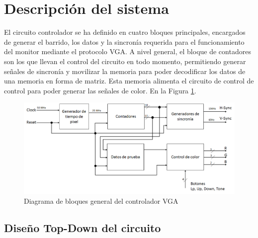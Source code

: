\documentclass[12pt,a4paper]{article}
\begin{document}
\section{Descripción del sistema}
El circuito controlador se ha definido en cuatro bloques principales, encargados de generar el barrido, los datos y la sincronía requerida para el funcionamiento del monitor mediante el protocolo VGA. A nivel general, el bloque de contadores son los que llevan el control del circuito en todo momento, permitiendo generar señales de sincronía y movilizar la memoria para poder decodificar los datos de una memoria en forma de matriz. Esta memoria alimenta el circuito de control de control para poder generar las señales de color. En la Figura \ref{fig:generalSys}.

\begin{figure}[hbtp]
	\centering
	\includegraphics[width=18cm]{Img/diagramaIntro.png}
	\caption{Diagrama de bloques general del controlador VGA}
	\label{fig:generalSys}
\end{figure}

\subsection{Diseño Top-Down del circuito}
\end{document}
